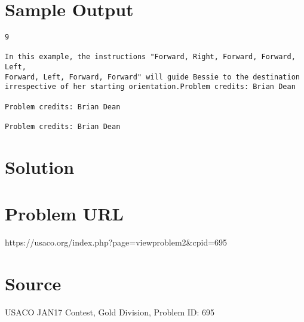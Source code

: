 \documentclass[12pt]{article}
\begin{document}
\section*{Sample Output}
\begin{verbatim}
9

In this example, the instructions "Forward, Right, Forward, Forward, Left,
Forward, Left, Forward, Forward" will guide Bessie to the destination
irrespective of her starting orientation.Problem credits: Brian Dean

Problem credits: Brian Dean

Problem credits: Brian Dean
\end{verbatim}

\section*{Solution}


\section*{Problem URL}
https://usaco.org/index.php?page=viewproblem2&cpid=695

\section*{Source}
USACO JAN17 Contest, Gold Division, Problem ID: 695
\end{document}
